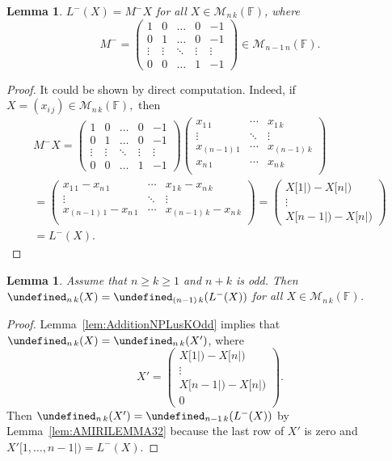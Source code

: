 \documentclass{elsarticle}
\def\F{{\mathbb F}}
\def\M{{\mathcal M}}
\let\det\undefined
\DeclareMathOperator{\det}{det}
\theoremstyle{plain}
\newtheorem{lemma}[theorem]{Lemma}
\theoremstyle{definition}
\numberwithin{equation}{section}
\begin{document}
\begin{lemma}\label{claim:LminusMatrixForm}$L^{-}(X) = M^{-}X$ for all $X \in \M_{n\,k}(\F)$, where
\[
M^{-} =
\begin{pmatrix}
1 & 0 & \ldots & 0 & -1\\
0 & 1 & \ldots & 0 & -1\\
\vdots & \vdots & \ddots & \vdots & \vdots\\
0 & 0 & \ldots & 1 & -1
\end{pmatrix}
\in \M_{n-1\,n}(\F).
\]
  \end{lemma}
\begin{proof}It could be shown by direct computation. Indeed, if $X = (x_{i\,j}) \in \M_{n\,k}(\F),$ then
\begin{multline*}
M^{-}X = \begin{pmatrix}
1 & 0 & \ldots & 0 & -1\\
0 & 1 & \ldots & 0 & -1\\
\vdots & \vdots & \ddots & \vdots & \vdots\\
0 & 0 & \ldots & 1 & -1
\end{pmatrix}
\begin{pmatrix}
x_{1\,1} & \cdots & x_{1\,k}\\
\vdots & \ddots & \vdots\\
x_{(n-1)\,1} & \cdots & x_{(n-1)\,k}\\
x_{n\,1} & \cdots & x_{n\,k}\\
\end{pmatrix}\\ = \begin{pmatrix}
x_{1\,1} - x_{n\,1} & \cdots & x_{1\,k} - x_{n\,k}\\
\vdots & \ddots & \vdots\\
x_{(n-1)\,1} - x_{n\,1} & \cdots & x_{(n-1)\,k} - x_{n\,k}\\
\end{pmatrix} = \begin{pmatrix}X[1|) - X[n|)\\ \vdots \\X[n-1|) - X[n|)\end{pmatrix}\\
 = L^{-}(X).
\end{multline*}
\end{proof}


\begin{lemma}\label{lem:DetNKLMinus}Assume that $n \ge k \ge 1$ and $n + k$ is odd. Then $\det_{n\,k}(X) = \det_{(n-1)\,k}(L^{-}(X))$ for all $X \in \M_{n\,k}(\F)$.
  \end{lemma}
  \begin{proof}Lemma~\ref{lem:AdditionNPLusKOdd} implies that $\det_{n\,k} (X) = \det_{n\,k}(X')$, where
  \[
  X' = \begin{pmatrix}X[1|) - X[n|)\\ \vdots \\X[n-1|) - X[n|)\\ 0\end{pmatrix}.
  \]
  Then $\det_{n\,k} (X') = \det_{n-1\,k} (L^{-}(X))$ by Lemma~\ref{lem:AMIRILEMMA32} because the last row of $X'$ is zero and $X'[1,\ldots, n-1|) = L^{-}(X)$.
\end{proof}
\end{document}
